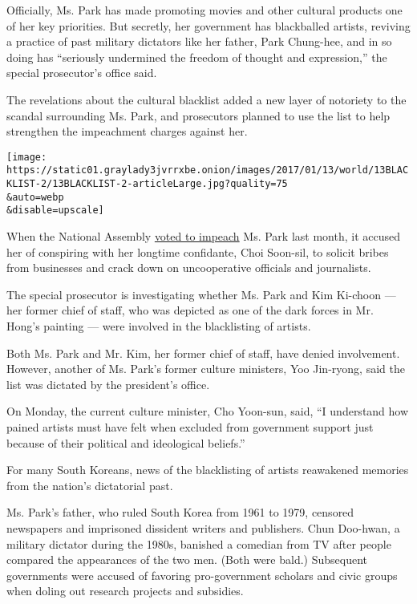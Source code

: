 Officially, Ms. Park has made promoting movies and other cultural
products one of her key priorities. But secretly, her government has
blackballed artists, reviving a practice of past military dictators like
her father, Park Chung-hee, and in so doing has ``seriously undermined
the freedom of thought and expression,'' the special prosecutor's office
said.

The revelations about the cultural blacklist added a new layer of
notoriety to the scandal surrounding Ms. Park, and prosecutors planned
to use the list to help strengthen the impeachment charges against her.

\texttt{[image: https://static01.graylady3jvrrxbe.onion/images/2017/01/13/world/13BLACKLIST-2/13BLACKLIST-2-articleLarge.jpg?quality=75\\\&auto=webp\\\&disable=upscale]}

When the National Assembly
\href{https://www.nytimes3xbfgragh.onion/2016/12/09/world/asia/south-korea-president-park-geun-hye-impeached.html}{voted
to impeach} Ms. Park last month, it accused her of conspiring with her
longtime confidante, Choi Soon-sil, to solicit bribes from businesses
and crack down on uncooperative officials and journalists.

The special prosecutor is investigating whether Ms. Park and Kim
Ki-choon --- her former chief of staff, who was depicted as one of the
dark forces in Mr. Hong's painting --- were involved in the blacklisting
of artists.

Both Ms. Park and Mr. Kim, her former chief of staff, have denied
involvement. However, another of Ms. Park's former culture ministers,
Yoo Jin-ryong, said the list was dictated by the president's office.

On Monday, the current culture minister, Cho Yoon-sun, said, ``I
understand how pained artists must have felt when excluded from
government support just because of their political and ideological
beliefs.''

For many South Koreans, news of the blacklisting of artists reawakened
memories from the nation's dictatorial past.

Ms. Park's father, who ruled South Korea from 1961 to 1979, censored
newspapers and imprisoned dissident writers and publishers. Chun
Doo-hwan, a military dictator during the 1980s, banished a comedian from
TV after people compared the appearances of the two men. (Both were
bald.) Subsequent governments were accused of favoring pro-government
scholars and civic groups when doling out research projects and
subsidies.

